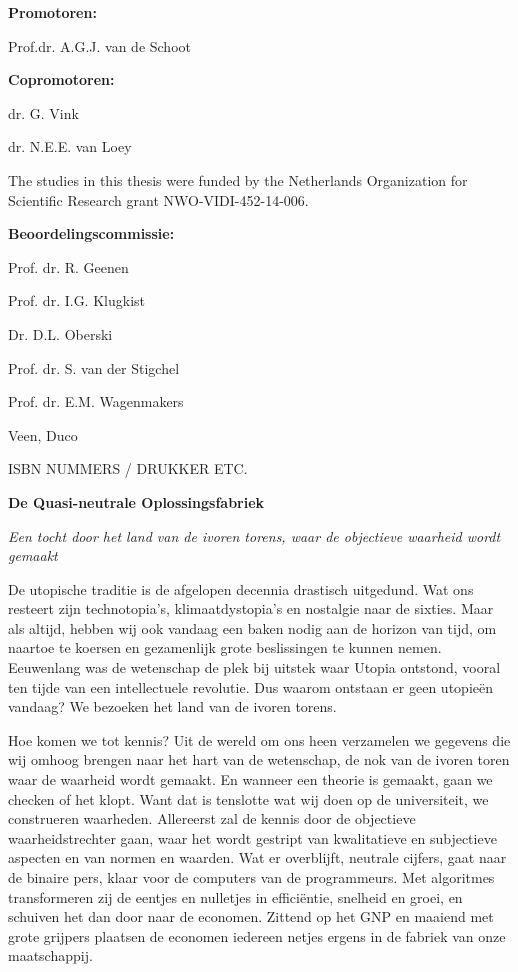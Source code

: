 \documentclass[openright,titlepage,12pt,a4paper]{book}
\begin{document}
\newpage

\pagestyle{empty}
\textbf{Promotoren:}


Prof.dr. A.G.J. van de Schoot

\textbf{Copromotoren:}

dr. G. Vink

dr. N.E.E. van Loey

\vspace*{\fill}

\noindent The studies in this thesis were funded by the Netherlands Organization for Scientific Research grant NWO-VIDI-452-14-006.

% 

\newpage


\textbf{Beoordelingscommissie:}

Prof. dr. R. Geenen

Prof. dr. I.G. Klugkist

Dr. D.L. Oberski 

Prof. dr. S. van der Stigchel

Prof. dr. E.M. Wagenmakers 

\vspace*{\fill}

\noindent Veen, Duco

\noindent ISBN NUMMERS / DRUKKER ETC.

\newpage

\textbf{De Quasi-neutrale Oplossingsfabriek}

\textit{Een tocht door het land van de ivoren torens, waar de objectieve waarheid wordt gemaakt}

De utopische traditie is de afgelopen decennia drastisch uitgedund. Wat ons resteert zijn technotopia's, klimaatdystopia's en nostalgie naar de sixties. Maar als altijd, hebben wij ook vandaag een baken nodig aan de horizon van tijd, om naartoe te koersen en gezamenlijk grote beslissingen te kunnen nemen. Eeuwenlang was de wetenschap de plek bij uitstek waar Utopia ontstond, vooral ten tijde van een intellectuele revolutie. Dus waarom ontstaan er geen utopieën vandaag? We bezoeken het land van de ivoren torens.

Hoe komen we tot kennis? Uit de wereld om ons heen verzamelen we gegevens die wij omhoog brengen naar het hart van de wetenschap, de nok van de ivoren toren waar de waarheid wordt gemaakt. En wanneer een theorie is gemaakt, gaan we checken of het klopt. Want dat is tenslotte wat wij doen op de universiteit, we construeren waarheden. Allereerst zal de kennis door de objectieve waarheidstrechter gaan, waar het wordt gestript van kwalitatieve en subjectieve aspecten en van normen en waarden. Wat er overblijft, neutrale cijfers, gaat naar de binaire pers, klaar voor de computers van de programmeurs. Met algoritmes transformeren zij de eentjes en nulletjes in efficiëntie, snelheid en groei, en schuiven het dan door naar de economen. Zittend op het GNP en maaiend met grote grijpers plaatsen de economen iedereen netjes ergens in de fabriek van onze maatschappij.
\end{document}
